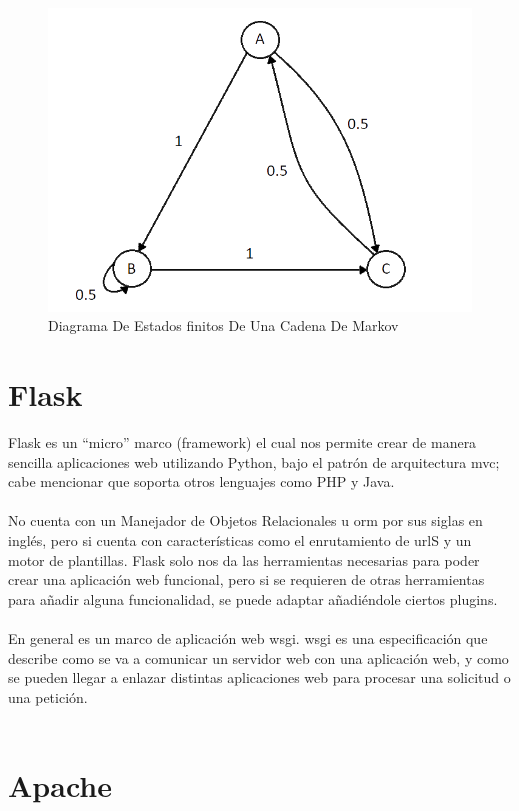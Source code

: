 \documentclass[12pt, a4paper, titlepage]{report}
\begin{document}
		\begin{figure}[H]
			\includegraphics[width=12cm]{./imagenes/MarcoTeorico/Markov/CMarkov.png}
			\centering 
			\caption{Diagrama De Estados finitos De Una Cadena De Markov \cite{refMarkov}}
		\end{figure}

		\section{Flask}
		Flask es un “micro” marco (framework) el cual nos permite crear de manera sencilla aplicaciones web utilizando Python, bajo el patrón de arquitectura \acrfull{mvc}; cabe mencionar que soporta otros lenguajes como PHP y Java.\cite{refFlask}\\\\
		No cuenta con un Manejador de Objetos Relacionales u \acrshort{orm} por sus siglas en inglés, pero si cuenta con características como el enrutamiento de \acrshort{url}S y un motor de plantillas. Flask solo nos da las herramientas necesarias para poder crear una aplicación web funcional, pero si se requieren de otras herramientas para añadir alguna funcionalidad, se puede adaptar añadiéndole ciertos plugins.\\\\
		En general es un marco de aplicación web \acrshort{wsgi}. \acrfull{wsgi} es una especificación que describe como se va a comunicar un servidor web con una aplicación web, y como se pueden llegar a enlazar distintas aplicaciones web para procesar una solicitud o una petición.\\\\		
		
	    \section{Apache}
	    
\end{document}
